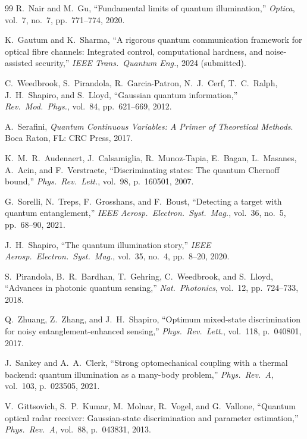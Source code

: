 \documentclass[journal]{IEEEtran}
\begin{document}
\begin{thebibliography}{99}
R.~Nair and M.~Gu, ``Fundamental limits of quantum illumination,'' \textit{Optica}, vol.~7, no.~7, pp.~771--774, 2020.

K.~Gautum and K.~Sharma, ``A rigorous quantum communication framework for optical fibre channels: Integrated control, computational hardness, and noise-assisted security,'' \textit{IEEE Trans.\ Quantum Eng.}, 2024 (submitted).

C.~Weedbrook, S.~Pirandola, R.~Garcia-Patron, N.~J.~Cerf, T.~C.~Ralph, J.~H.~Shapiro, and S.~Lloyd, ``Gaussian quantum information,'' \textit{Rev.\ Mod.\ Phys.}, vol.~84, pp.~621--669, 2012.

A.~Serafini, \textit{Quantum Continuous Variables: A Primer of Theoretical Methods}. Boca Raton, FL: CRC Press, 2017.

K.~M.~R.~Audenaert, J.~Calsamiglia, R.~Munoz-Tapia, E.~Bagan, L.~Masanes, A.~Acin, and F.~Verstraete, ``Discriminating states: The quantum Chernoff bound,'' \textit{Phys.\ Rev.\ Lett.}, vol.~98, p.~160501, 2007.

G.~Sorelli, N.~Treps, F.~Grosshans, and F.~Boust, ``Detecting a target with quantum entanglement,'' \textit{IEEE Aerosp.\ Electron.\ Syst.\ Mag.}, vol.~36, no.~5, pp.~68--90, 2021.

J.~H.~Shapiro, ``The quantum illumination story,'' \textit{IEEE Aerosp.\ Electron.\ Syst.\ Mag.}, vol.~35, no.~4, pp.~8--20, 2020.

S.~Pirandola, B.~R.~Bardhan, T.~Gehring, C.~Weedbrook, and S.~Lloyd, ``Advances in photonic quantum sensing,'' \textit{Nat.\ Photonics}, vol.~12, pp.~724--733, 2018.

Q.~Zhuang, Z.~Zhang, and J.~H.~Shapiro, ``Optimum mixed-state discrimination for noisy entanglement-enhanced sensing,'' \textit{Phys.\ Rev.\ Lett.}, vol.~118, p.~040801, 2017.

J.~Sankey and A.~A.~Clerk, ``Strong optomechanical coupling with a thermal backend: quantum illumination as a many-body problem,'' \textit{Phys.\ Rev.\ A}, vol.~103, p.~023505, 2021.

V.~Gittsovich, S.~P.~Kumar, M.~Molnar, R.~Vogel, and G.~Vallone, ``Quantum optical radar receiver: Gaussian-state discrimination and parameter estimation,'' \textit{Phys.\ Rev.\ A}, vol.~88, p.~043831, 2013.


\end{thebibliography}
\end{document}
